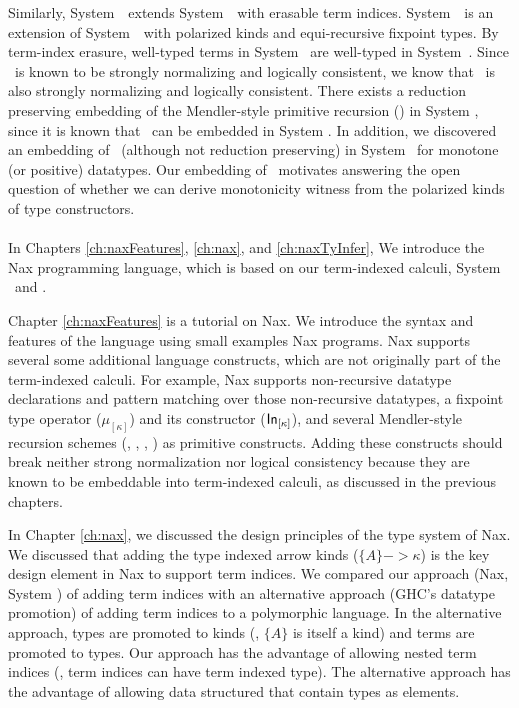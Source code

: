 Similarly, System~\Fixi\ extends System~\Fixw\ with erasable term indices.
System~\Fixw\ is an extension of System~\Fw\ with polarized kinds and
equi-recursive fixpoint types. By term-index erasure, well-typed terms
in System \Fixi\ are well-typed in System~\Fixw. Since \Fixw\ is known
to be strongly normalizing and logically consistent, we know that \Fixi\ is
also strongly normalizing and logically consistent.
There exists a reduction preserving embedding of the Mendler-style
primitive recursion (\MPr) in System \Fixi, since it is known that \MPr\ can
be embedded in System \Fixw. In addition, we discovered an embedding of \McvPr\ 
(although not reduction preserving) in System \Fixi\ for monotone (or positive)
datatypes. Our embedding of \McvPr\ motivates answering the open question of
whether we can derive monotonicity witness from the polarized kinds of
type constructors.

\paragraph{}
In Chapters \ref{ch:naxFeatures}, \ref{ch:nax}, and \ref{ch:naxTyInfer},
We introduce the Nax programming language, which is based on
our term-indexed calculi, System \Fi\ and \Fixi.

Chapter \ref{ch:naxFeatures} is a tutorial on Nax.
We introduce the syntax and features of the language
using small examples Nax programs.
Nax supports several some additional language constructs,
which are not originally part of the term-indexed calculi.
For example, Nax supports non-recursive datatype declarations and
pattern matching over those non-recursive datatypes,
a fixpoint type operator ($\mu_{[\kappa]}$) and
its constructor ($\mathsf{In}_{[\kappa]}$), and
several Mendler-style recursion schemes (\MIt, \MPr, \McvPr, \MsfIt)
as primitive constructs. Adding these constructs should break neither
strong normalization nor logical consistency because they are known to
be embeddable into term-indexed calculi, as discussed in the previous chapters.

In Chapter \ref{ch:nax}, we discussed the design principles of
the type system of Nax. We discussed that adding the type indexed arrow kinds
($\{A\} -> \kappa$) is the key design element in Nax to support term indices.
We compared our approach (Nax, System \Fi) of adding term indices with
an alternative approach (GHC's datatype promotion) of adding
term indices to a polymorphic language. In the alternative approach,
types are promoted to kinds (\ie, $\{A\}$ is itself a kind) and
terms are promoted to types. Our approach has the advantage of
allowing nested term indices (\ie, term indices can have term indexed type).
The alternative approach has the advantage of allowing data structured that
contain types as elements.

